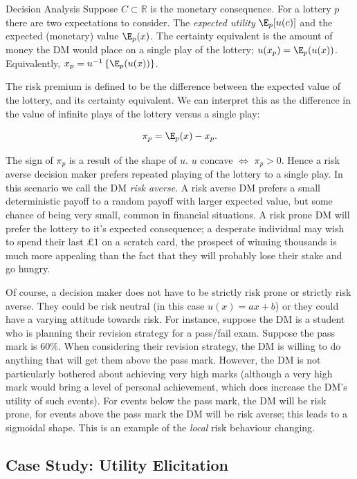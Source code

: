 \begin{chapter}{Decision Analysis \label{Ch:decision}}
Suppose $C \subset \mathbb{R}$ is the monetary consequence. For a lottery $p$ there are two expectations to consider. The \textit{expected utility} $\E_p[u(c)]$ and the expected (monetary) value $\E_{p} (x)$. The certainty equivalent is the amount of money the DM would place on a single play of the lottery; $u(x_p) = \E_p(u(x))$. Equivalently, $x_p = u^{-1} \left\{ \E_{p} (u(x)) \right\}$.

The risk premium is defined to be the difference between the expected value of the lottery, and its certainty equivalent. We can interpret this as the difference in the value of infinite plays of the lottery versus a single play:

\begin{equation}
	\pi_p = \E_p (x) - x_p.
\end{equation}

The sign of $\pi_p$ is a result of the shape of $u$. $u$ concave $\iff$ $\pi_p > 0$. Hence a risk averse decision maker prefers repeated playing of the lottery to a single play. In this scenario we call the DM \textit{risk averse}. A risk averse DM prefers a small deterministic payoff to a random payoff with larger expected value, but some chance of being very small, common in financial situations. A risk prone DM will prefer the lottery to it's expected consequence; a desperate individual may wish to spend their last $\pounds 1$ on a scratch card, the prospect of winning thousands is much more appealing than the fact that they will probably lose their stake and go hungry.

Of course, a decision maker does not have to be strictly risk prone or strictly risk averse. They could be risk neutral (in this case $u(x) = ax + b$) or they could have a varying attitude towards risk. For instance, suppose the DM is a student who is planning their revision strategy for a pass/fail exam. Suppose the pass mark is $60\%$. When considering their revision strategy, the DM is willing to do anything that will get them above the pass mark. However, the DM is not particularly bothered about achieving very high marks (although a very high mark would bring a level of personal achievement, which does increase the DM's utility of such events). For events below the pass mark, the DM will be risk prone, for events above the pass mark the DM will be risk averse; this leads to a sigmoidal shape. This is an example of the \textit{local} risk behaviour changing.

\subsection{Case Study: Utility Elicitation}


\end{chapter}

